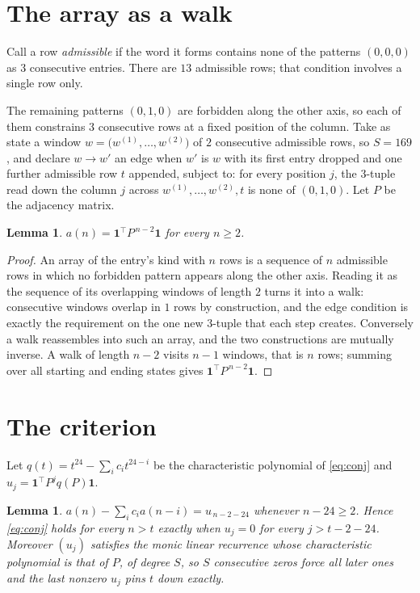 \documentclass[11pt,a4paper]{article}
\theoremstyle{plain}
\newtheorem{lemma}[theorem]{Lemma}
\theoremstyle{definition}
\begin{document}
\section{The array as a walk}

Call a row \emph{admissible} if the word it forms contains none of the patterns
$(0,0,0)$ as $3$ consecutive entries. There are $13$ admissible rows; that condition
involves a single row only.

The remaining patterns $(0,1,0)$ are forbidden along the other axis, so each of them
constrains $3$ consecutive rows at a fixed position of the column. Take as state a
window $w=\bigl(w^{(1)},\dots,w^{(2)}\bigr)$ of $2$ consecutive admissible
rows, so $S=169$, and declare $w\to w'$ an edge when $w'$ is $w$ with its first entry
dropped and one further admissible row $t$ appended, subject to: for every position
$j$, the $3$-tuple read down the column $j$ across $w^{(1)},\dots,w^{(2)},t$
is none of $(0,1,0)$. Let $P$ be the adjacency matrix.

\begin{lemma}\label{lem:walk}
$a(n)=\mathbf{1}^{\!\top}P^{\,n-2}\mathbf{1}$ for every $n\ge2$.
\end{lemma}

\begin{proof}
An array of the entry's kind with $n$ rows is a sequence of $n$ admissible rows in
which no forbidden pattern appears along the other axis. Reading it as the sequence of its
overlapping windows of length $2$ turns it into a walk: consecutive windows overlap in
$1$ rows by construction, and the edge condition is exactly the requirement on the one
new $3$-tuple that each step creates. Conversely a walk reassembles into such an array,
and the two constructions are mutually inverse. A walk of length $n-2$ visits $n-1$
windows, that is $n$ rows; summing over all starting and ending states gives
$\mathbf{1}^{\!\top}P^{\,n-2}\mathbf{1}$.
\end{proof}

\section{The criterion}

Let $q(t)=t^{24}-\sum_i c_i t^{24-i}$ be the characteristic polynomial of
\eqref{eq:conj} and $u_j=\mathbf{1}^{\!\top}P^{j}q(P)\mathbf{1}$.

\begin{lemma}\label{lem:crit}
$a(n)-\sum_i c_i a(n-i)=u_{\,n-2-24}$ whenever $n-24\ge2$. Hence
\eqref{eq:conj} holds for every $n>t$ exactly when $u_j=0$ for every
$j>t-2-24$. Moreover $(u_j)$ satisfies the monic linear recurrence whose
characteristic polynomial is that of $P$, of degree $S$, so $S$ consecutive zeros force all
later ones and the last nonzero $u_j$ pins $t$ down exactly.
\end{lemma}
\end{document}
